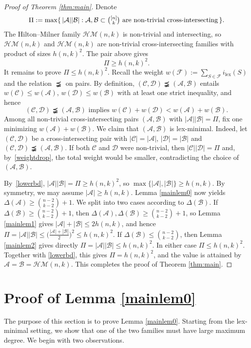 \documentclass[a4paper,11pt]{article}
\newcommand{\m}{\mathcal}
\begin{document}
\begin{proof}[Proof of Theorem \ref{thm:main}]
Denote 
\[
\Pi:=\max\{\,|\m A||\m B| : \m A,\m B\subset \tbinom{[n]}{k}
\text{ are non-trivial cross-intersecting}\,\}.
\]
The Hilton--Milner family $\m{HM}(n,k)$ is non-trivial and intersecting,
so $\m{HM}(n,k)$ and $\m{HM}(n,k)$ are non-trivial cross-intersecting families with product of sizes $h(n,k)^2$. The pair above gives
\begin{equation}\label{lowerbd}
\Pi\ge h(n,k)^2.
\end{equation}
It remains to prove $\Pi\le h(n,k)^2$.
Recall the weight $w(\m F):=\sum_{S\in\m F}
i_{\mathrm{lex}}(S)$ and the relation $\precneqq$ on pairs. By definition,
$(\m C,\m D)\precneqq(\m A,\m B)$ entails $w(\m C)\le w(\m A)$,
$w(\m D)\le w(\m B)$ with at least one strict inequality, and hence
\begin{equation}\label{weightdrop}
 (\m C,\m D)\precneqq(\m A,\m B) \text{ implies }
w(\m C)+w(\m D)<w(\m A)+w(\m B).
\end{equation}
Among all non-trivial cross-intersecting pairs $(\m A,\m B)$ with
$|\m A||\m B|=\Pi$, fix one minimizing $w(\m A)+w(\m B)$. 
We claim that $(\m A,\m B)$ is lex-minimal. Indeed, let
$(\m C,\m D)$ be a cross-intersecting pair with
$|\m C|=|\m A|$, $|\m D|=|\m B|$ and
$(\m C,\m D)\precneqq(\m A,\m B)$. If both $\m C$ and $\m D$
were non-trivial, then $|\m C||\m D|=\Pi$ and, by~\eqref{weightdrop},
the total weight would be smaller, contradicting the choice of
$(\m A,\m B)$.

By~\eqref{lowerbd}, $|\m A||\m B|=\Pi\ge h(n,k)^2$, so
$\max\{|\m A|,|\m B|\}\ge h(n,k)$. 
By symmetry, we may assume $|\m A|\ge h(n,k).$
Lemma \ref{mainlem0} now yields $\Delta(\m A)\ge \binom{n-2}{k-2}+1.$
We split into two cases according to $\Delta(\m B)$.
If $\Delta(\m B)\ge \binom{n-2}{k-2}+1$, then $\Delta(\m A),\Delta(\m B)\ge \binom{n-2}{k-2}+1$, so
Lemma \ref{mainlem1} gives $|\m A|+|\m B|\le 2h(n,k)$, and hence
$\Pi=|\m A||\m B|\le\Big(\tfrac{|\m A|+|\m B|}{2}\Big)^2\le h(n,k)^2.$
If $\Delta(\m B)\le \binom{n-2}{k-2}$, then  
Lemma \ref{mainlem2} gives directly $\Pi=|\m A||\m B|\le h(n,k)^2.$ 
In either case $\Pi\le h(n,k)^2$. Together with \eqref{lowerbd}, this gives
$\Pi=h(n,k)^2$, and the value is attained by $\m A=\m B=\m{HM}(n,k)$. This
completes the proof of Theorem \ref{thm:main}.
\end{proof}


\section{Proof of Lemma \ref{mainlem0}}\label{sec:large-degree}
The purpose of this section is to prove Lemma \ref{mainlem0}. Starting from the
lex-minimal setting, we show that one of the two families must have
large maximum degree.
We begin with two observations. 
\end{document}
